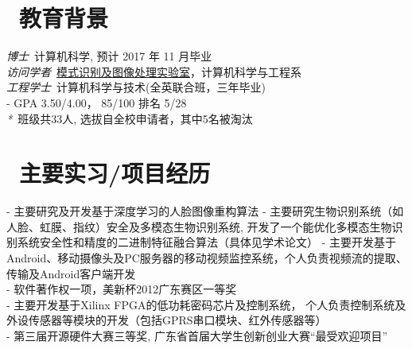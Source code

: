 \documentclass{resume}
\begin{document}


 
\section{\faGraduationCap\  教育背景}
\textit{博士}\ 计算机科学, 预计 2017 年 11 月毕业\\
\textit{访问学者}\ \href{http://biometrics.cse.msu.edu/}{模式识别及图像处理实验室}，计算机科学与工程系\\
\textit{工程学士}\ 计算机科学与技术(全英联合班，三年毕业)\\
- GPA 3.50/4.00， 85/100 排名 5/28\\
\textit{*}\ 班级共33人, 选拔自全校申请者，其中5名被淘汰\\

\section{\faUsers\ 主要实习/项目经历}
- 主要研究及开发基于深度学习的人脸图像重构算法
- 主要研究生物识别系统（如人脸、虹膜、指纹）安全及多模态生物识别系统, 开发了一个能优化多模态生物识别系统安全性和精度的二进制特征融合算法（具体见学术论文）
- 主要开发基于Android、移动摄像头及PC服务器的移动视频监控系统，个人负责视频流的提取、传输及Android客户端开发\\
- 软件著作权一项，美新杯2012广东赛区一等奖\\
- 主要开发基于Xilinx FPGA的低功耗密码芯片及控制系统， 个人负责控制系统及外设传感器等模块的开发（包括GPRS串口模块、红外传感器等）\\
- 第三届开源硬件大赛三等奖, 广东省首届大学生创新创业大赛“最受欢迎项目”
\end{document}
